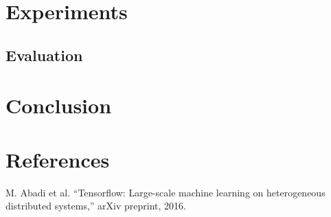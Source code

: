 \documentclass[conference]{IEEEtran}
\begin{document}
\section{Experiments}

\subsection{Evaluation}

\section{Conclusion}

\section*{References}

\begin{thebibliography}{00}

	\iffalse	
	Ich (Alex) hab schon mit der Art von Quellenangaben gearbeitet, finde ich persönlich relativ praktisch. Kann mich gerne ums ordnen kümmern.
	Angabe: 
	
		\bibitem{AuthorYear}
		
	Ordnen muss man manuell, das kann ich machen. 
	Am besten im gleichen Stil angeben wie das Beispiel, zur Not korrigiere ich das dann einfach, damit es einheitlich ist.
	\fi
	
 M. Abadi et al. ``Tensorflow: Large-scale machine learning on heterogeneous distributed systems,'' arXiv preprint, 2016.
\end{thebibliography}
\end{document}
